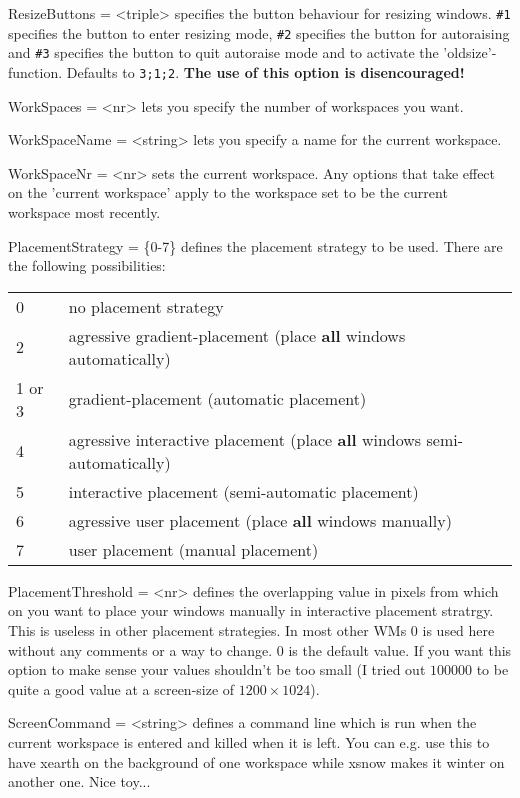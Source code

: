\documentclass[10pt,a4paper]{article}
\newenvironment{ttdesc}[1]{
   \begin{list}{}{
          \renewcommand{\makelabel}[1]{\texttt{##1\hfill}}}}{\end{list}}
\begin{document}
\begin{ttdesc}{description}
\item[ResizeButtons = <triple>] specifies the button behaviour for resizing windows. \texttt{\#1} specifies the button to enter resizing mode, \texttt{\#2} specifies the button for autoraising and \texttt{\#3} specifies the button to quit autoraise mode and to activate the 'oldsize'-function. Defaults to \texttt{3;1;2}. \textbf{The use of this option is disencouraged!}

\item[WorkSpaces = <nr>] lets you specify the number of workspaces you want.

\item[WorkSpaceName = <string>] lets you specify a name for the current workspace.

\item[WorkSpaceNr = <nr>] sets the current workspace. Any options that take effect on the 'current workspace' apply to the workspace set to be the current workspace most recently.

\item[PlacementStrategy = \{0-7\}] defines the placement strategy to be used. There are the following possibilities:\\
\begin{tabular}{ll}
0 & no placement strategy\\
2 & agressive gradient-placement (place \textbf{all} windows automatically)\\
1 or 3 \dotfill& gradient-placement (automatic placement)\\
4 & agressive interactive placement (place \textbf{all} windows semi-automatically) \\
5 & interactive placement (semi-automatic placement)\\
6 & agressive user placement (place \textbf{all} windows manually)\\
7 & user placement (manual placement)
\end{tabular}

\item[PlacementThreshold = <nr>] defines the overlapping value in pixels from which on you want to place your windows manually in interactive placement stratrgy. This is useless in other placement strategies. In most other WMs $0$ is used here without any comments or a way to change. $0$ is the default value. If you want this option to make sense your values shouldn't be too small (I tried out $100000$ to be quite a good value at a screen-size of $1200\times1024$).

\item[ScreenCommand = <string>] defines a command line which is run when the current workspace is entered and killed when it is left. You can e.g. use this to have xearth on the background of one workspace while xsnow makes it winter on another one. Nice toy...


\end{ttdesc}
\end{document}
